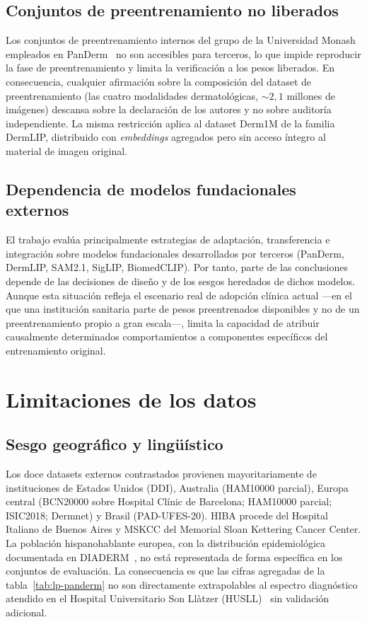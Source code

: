 \subsection{Conjuntos de preentrenamiento no liberados}
\label{sec:lim-preentrenamiento}

Los conjuntos de preentrenamiento internos del grupo de la Universidad
Monash empleados en PanDerm~\cite{panderm2025} no son accesibles para
terceros, lo que impide reproducir la fase de preentrenamiento y limita
la verificación a los pesos liberados. En consecuencia, cualquier
afirmación sobre la composición del dataset de preentrenamiento (las
cuatro modalidades dermatológicas, $\sim 2{,}1$ millones de imágenes)
descansa sobre la declaración de los autores y no sobre auditoría
independiente. La misma restricción aplica al dataset Derm1M de la
familia DermLIP, distribuido con \emph{embeddings} agregados pero sin
acceso íntegro al material de imagen original.

\subsection{Dependencia de modelos fundacionales externos}
\label{sec:lim-dependencia-externa}

El trabajo evalúa principalmente estrategias de adaptación,
transferencia e integración sobre modelos fundacionales desarrollados
por terceros (PanDerm, DermLIP, SAM2.1, SigLIP, BiomedCLIP). Por tanto,
parte de las conclusiones depende de las decisiones de diseño y de los
sesgos heredados de dichos modelos. Aunque esta situación refleja el
escenario real de adopción clínica actual ---en el que una institución
sanitaria parte de pesos preentrenados disponibles y no de un
preentrenamiento propio a gran escala---, limita la capacidad de atribuir
causalmente determinados comportamientos a componentes específicos del
entrenamiento original.

\section{Limitaciones de los datos}
\label{sec:lim-datos}

\subsection{Sesgo geográfico y lingüístico}
\label{sec:lim-geografico}

Los doce datasets externos contrastados provienen mayoritariamente
de instituciones de Estados Unidos (DDI), Australia
(HAM10000 parcial), Europa central (BCN20000 sobre Hospital Clínic
de Barcelona; HAM10000 parcial; ISIC2018; Dermnet) y Brasil
(PAD-UFES-20). HIBA procede del Hospital Italiano de Buenos Aires
y MSKCC del Memorial Sloan Kettering Cancer Center. La población
hispanohablante europea, con la distribución epidemiológica
documentada en DIADERM~\cite{diaderm2018}, no está representada de
forma específica en los conjuntos de evaluación. La consecuencia
es que las cifras agregadas de la tabla~\ref{tab:lp-panderm} no
son directamente extrapolables al espectro diagnóstico atendido en
el Hospital Universitario Son Llàtzer
(HUSLL)~\cite{taberner2010_motivos} sin validación adicional.

